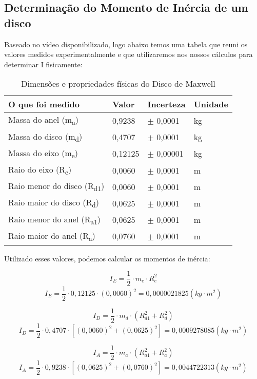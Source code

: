 \subsection{Determinação do Momento de Inércia de um disco}

Baseado no vídeo disponibilizado, logo abaixo temos uma tabela que reuni os valores medidos experimentalmente e que utilizaremos nos nossos cálculos para determinar I fisicamente:

\begin{table}[H]
    \centering
    \begin{tabular}{ |M{5cm}||M{2cm}||M{2cm}||M{2cm}|  }
        \hline
        \textbf{O que foi medido} & \textbf{Valor} & \textbf{Incerteza} & \textbf{Unidade}\\
        \hline
        Massa do anel (m\textsubscript{a})          & 0,9238    & $\pm$ 0,0001  & kg\\
        Massa do disco (m\textsubscript{d})         & 0,4707    & $\pm$ 0,0001  & kg\\
        Massa do eixo (m\textsubscript{e})          & 0,12125   & $\pm$ 0,00001 & kg\\
        Raio do eixo (R\textsubscript{e})           & 0,0060    & $\pm$ 0,0001  & m\\
        Raio menor do disco (R\textsubscript{d1})   & 0,0060    & $\pm$ 0,0001  & m\\
        Raio maior do disco (R\textsubscript{d})    & 0,0625    & $\pm$ 0,0001  & m\\
        Raio menor do anel (R\textsubscript{a1})    & 0,0625    & $\pm$ 0,0001  & m\\
        Raio maior do anel (R\textsubscript{a})     & 0,0760    & $\pm$ 0,0001  & m\\
        \hline
    \end{tabular}
    \caption{Dimensões e propriedades físicas do Disco de Maxwell}
\end{table}

Utilizado esses valores, podemos calcular os momentos de inércia:

\[I_E = \frac{1}{2} \cdot m_e \cdot R_e^2\]
\[I_E = \frac{1}{2} \cdot 0,12125 \cdot (0,0060)^2 = 0,0000021825 (kg \cdot m^2)\]

\[I_D = \frac{1}{2} \cdot m_d \cdot (R_{d1}^2 + R_d^2)\]
\[I_D = \frac{1}{2} \cdot 0,4707 \cdot [(0,0060)^2 + (0,0625)^2] = 0,0009278085 (kg \cdot m^2) \]

\[I_A = \frac{1}{2} \cdot m_a \cdot (R_{a1}^2 + R_a^2)\]
\[I_A = \frac{1}{2} \cdot 0,9238 \cdot [(0,0625)^2 + (0,0760)^2] = 0,0044722313 (kg \cdot m^2) \]

